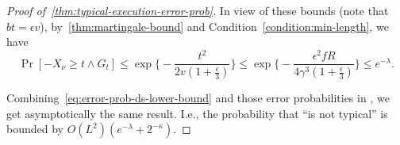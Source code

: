 \begin{proof}[Proof of~\cref{thm:typical-execution-error-prob}]
    In view of these bounds (note that $bt = \epsilon v$), by~\cref{thm:martingale-bound} and Condition~\eqref{condition:min-length}, we have
    \begin{equation} \label{eq:error-prob-ds-lower-bound}
        \Pr [-X_\nu \ge t \wedge G_t] \le \exp \Big\{ -\frac{t^2}{2v (1 + \frac{\epsilon}{3})} \Big\} \le \exp \Big\{ -\frac{\epsilon^2 f R}{4\gamma^3 (1 + \frac{\epsilon}{3})} \Big\} \le e^{-\lambda}.
    \end{equation}

    Combining~\cref{eq:error-prob-ds-lower-bound} and those error probabilities in \cite{EPRINT:GarKiaLeo20}, we get asymptotically the same result. I.e., the probability that ``\E is not typical'' is bounded by $O(L^2)(e^{-\lambda} + 2^{-\kappa})$.
\end{proof}

